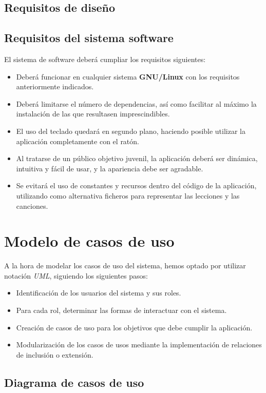 \subsection{Requisitos de diseño}

\subsection{Requisitos del sistema software}
El sistema de software deberá cumpliar los requisitos siguientes:
\begin{itemize}
\item Deberá funcionar en cualquier sistema \textbf{GNU/Linux} con los
  requisitos anteriormente indicados.
\item Deberá limitarse el número de dependencias, así como facilitar al máximo
  la instalación de las que resultasen imprescindibles.
\item El uso del teclado quedará en segundo plano, haciendo posible utilizar la
  aplicación completamente con el ratón.
\item Al tratarse de un público objetivo juvenil, la aplicación deberá ser
  dinámica, intuitiva y fácil de usar, y la apariencia debe ser agradable.
\item Se evitará el uso de constantes y recursos dentro del código de la
  aplicación, utilizando como alternativa ficheros para representar las
  lecciones y las canciones.
\end{itemize}

\section{Modelo de casos de uso}

A la hora de modelar los casos de uso del sistema, hemos optado por utilizar
notación \textit{UML}, siguiendo los siguientes pasos:
\begin{itemize}
\item Identificación de los usuarios del sistema y sus roles.
\item Para cada rol, determinar las formas de interactuar con el sistema.
\item Creación de casos de uso para los objetivos que debe cumplir la aplicación.
\item Modularización de los casos de usos mediante la implementación de
  relaciones de inclusión o extensión.
\end{itemize}

\subsection{Diagrama de casos de uso}

